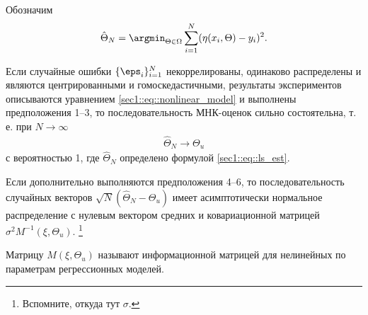 Обозначим
\begin{gather}
    \label{sec1::eq::ls_est}
    \hat \Theta_N = \argmin_{\Theta \in \Omega} \sum_{i = 1}^N (\eta(x_i, \Theta) - y_i)^2.
\end{gather}

\begin{thm}
    Если случайные ошибки $\{\eps_i\}_{i=1}^N$ некоррелированы, одинаково распределены и являются центрированными и гомоскедастичными, результаты
    экспериментов описываются уравнением \eqref{sec1::eq::nonlinear_model} и выполнены предположения 1--3,
    то последовательность МНК-оценок сильно состоятельна,
    т. е. при $N \to \infty$
    \begin{gather*}
        \hat \Theta_N \to \Theta_u
    \end{gather*}
    с вероятностью 1, где $\hat \Theta_N$ определено формулой \eqref{sec1::eq::ls_est}.

    Если дополнительно выполняются предположения 4--6, то последовательность случайных векторов $\sqrt N (\hat \Theta_N - \Theta_u)$
    имеет асимптотически нормальное распределение с нулевым вектором средних и ковариационной матрицей $\sigma^2 M^{-1}(\xi, \Theta_u)$.
    \footnote{Вспомните, откуда тут $\sigma$.}
\end{thm}

Матрицу $M(\xi, \Theta_u)$ называют информационной матрицей для нелинейных по параметрам регрессионных моделей.
